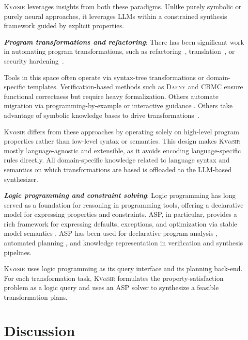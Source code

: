 \documentclass[nonacm,sigplan]{acmart}
\newcommand{\sys}{{\scshape Kv{$\alpha$}sir}\xspace}
\newcommand{\heading}[1]{\vspace{2pt}\noindent\textbf{\emph{#1}}:\enspace}
\begin{document}
\sys leverages insights from both these paradigms.
Unlike purely symbolic or purely neural approaches, it leverages LLMs within a
constrained synthesis framework guided by explicit properties.

\heading{Program transformations and refactoring}
There has been significant work in automating program transformations,
such as refactoring~\cite{Fowler99,Mens04,Myers16,burson1990program}, translation~\cite{kopetzki2021towards,ledley1962automatic}, or security hardening~\cite{vasilakis2018breakapp,mir:ccs:2021, rebau2001dependable}. %

Tools in this space often operate via syntax-tree transformations or
domain-specific templates.
Verification-based methods such as \textsc{Dafny}
\cite{leino2016dafny} and \textsc{CBMC} \cite{Clarke04} ensure functional correctness
but require heavy formalization.
Others automate migration via
programming-by-example or interactive guidance \cite{gulwani2017program, le2017interactive}.
Others take advantage of symbolic knowledge bases to drive transformations~\cite{burson1990program}.

\sys differs from these approaches by operating solely on high-level program
properties rather than low-level syntax or semantics.
This design makes \sys
mostly language-agnostic and extensible, as it avoids encoding language-specific rules
directly.
All domain-specific knowledge related to language
syntax and semantics on which transformations are based is offloaded to the LLM-based synthesizer.

\heading{Logic programming and constraint solving}
Logic programming has long served as a foundation for reasoning in programming
tools, offering a declarative model for expressing properties and constraints.
ASP, in particular, provides a rich framework for
expressing defaults, exceptions, and optimization via stable model semantics
\cite{Gelfond_2000, Gelfond_2002, Eiter_2009}. 
ASP has been used for
declarative program analysis \cite{benton2007interactive}, automated planning
\cite{nguyen2020explainable, son2022answersetplanningsurvey}, and knowledge
representation in verification and synthesis pipelines.

\sys uses logic programming as its query interface and its planning back-end.
For each transformation task, \sys formulates the property-satisfaction problem as a logic query and uses an ASP solver to synthesize a feasible transformation plans.

\section{Discussion}
\label{sec:discussion}
\end{document}

